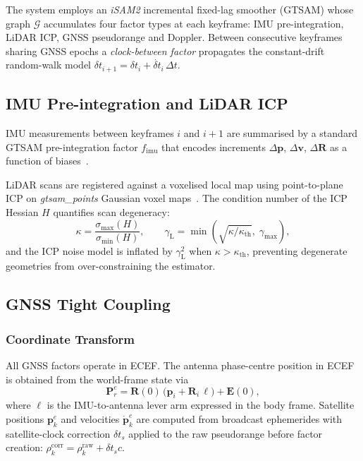 \documentclass[journal]{IEEEtran}
\newcommand{\E}{\mathbf{E}}           %
\newcommand{\Rext}{\mathbf{R}}        %
\newcommand{\pe}{\mathbf{p}}
\newcommand{\ve}{\mathbf{v}}
\begin{document}
The system employs an \emph{iSAM2} incremental fixed-lag smoother
(GTSAM) whose graph $\mathcal{G}$ accumulates four factor types at each
keyframe: IMU pre-integration, LiDAR ICP, GNSS pseudorange and Doppler.
Between consecutive keyframes sharing GNSS epochs a
\emph{clock-between factor} propagates the constant-drift random-walk
model $\delta t_{i+1} = \delta t_i + \dot{\delta t}_i \,\Delta t$.

\subsection{IMU Pre-integration and LiDAR ICP}
\label{sec:imu_lidar}

IMU measurements between keyframes $i$ and $i{+}1$ are summarised by a
standard GTSAM pre-integration factor $f_{\mathrm{imu}}$ that encodes
increments $\Delta\pe$, $\Delta\ve$, $\Delta\mathbf{R}$ as a function of
biases~\cite{forster2017}.

LiDAR scans are registered against a voxelised local map using
point-to-plane ICP on \textit{gtsam\_points} Gaussian voxel
maps~\cite{koide2023}. The condition number of the ICP Hessian $H$
quantifies scan degeneracy:
\begin{equation}
  \kappa = \frac{\sigma_{\max}(H)}{\sigma_{\min}(H)}, \qquad
  \gamma_{\mathrm{L}} = \min\!\left(\sqrt{\kappa / \kappa_{\mathrm{th}}},\;
                                    \gamma_{\max}\right),
  \label{eq:icp_health}
\end{equation}
and the ICP noise model is inflated by $\gamma_{\mathrm{L}}^2$ when
$\kappa > \kappa_{\mathrm{th}}$, preventing degenerate geometries from
over-constraining the estimator.

\subsection{GNSS Tight Coupling}
\label{sec:gnss}

\subsubsection{Coordinate Transform}

All GNSS factors operate in ECEF.  The antenna phase-centre position in
ECEF is obtained from the world-frame state via
\begin{equation}
  \mathbf{P}_r^e = \Rext(0)\,\bigl(\pe_i +
    \mathbf{R}_i\,\bm{\ell}\bigr) + \E(0),
  \label{eq:ecef_pos}
\end{equation}
where $\bm{\ell}$ is the IMU-to-antenna lever arm expressed in the body
frame.  Satellite positions $\mathbf{p}_k^e$ and velocities $\dot{\mathbf{p}}_k^e$
are computed from broadcast ephemerides with satellite-clock correction
$\delta t_s$ applied to the raw pseudorange before factor creation:
$\rho_k^{\mathrm{corr}} = \rho_k^{\mathrm{raw}} + \delta t_s c$.
\end{document}
